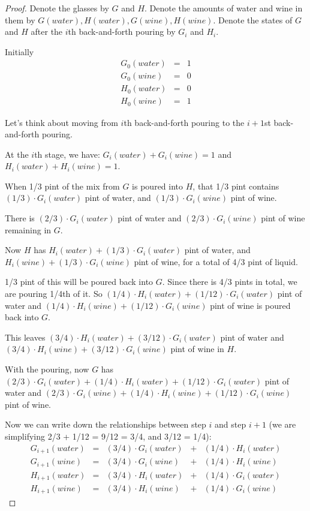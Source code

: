 \documentclass[14pt]{extarticle}
\begin{document}
\begin{proof}
Denote the glasses by $G$ and $H$. Denote the amounts of water and wine in them by $G(water), H(water), G(wine), H(wine)$. Denote the states of $G$ and $H$ after the $i$th back-and-forth pouring by $G_i$ and $H_i$.

Initially
$$
\begin{array}{lcl}
G_0(water)&=&1\\
G_0(wine)&=&0\\
H_0(water)&=&0\\
H_0(wine)&=&1
\end{array}
$$

Let's think about moving from $i$th back-and-forth pouring to the $i+1$st back-and-forth pouring.

At the $i$th stage, we have: $G_i(water) + G_i(wine) = 1$ and $H_i(water) + H_i(wine) = 1$.

When 1/3 pint of the mix from $G$ is poured into $H$, that 1/3 pint contains $(1/3) \cdot G_i(water)$ pint of water, and $(1/3) \cdot G_i(wine)$ pint of wine.

There is $(2/3) \cdot G_i(water)$ pint of water and $(2/3) \cdot G_i(wine)$ pint of wine remaining in $G$.

Now $H$ has $H_i(water) + (1/3)\cdot G_i(water)$ pint of water, and $H_i(wine) + (1/3)\cdot G_i(wine)$ pint of wine, for a total of 4/3 pint of liquid.

1/3 pint of this will be poured back into $G$. Since there is 4/3 pints in total, we are pouring 1/4th of it. So $(1/4) \cdot H_i(water) + (1/12)\cdot G_i(water)$ pint of water and $(1/4) \cdot H_i(wine) + (1/12)\cdot G_i(wine)$ pint of wine is poured back into $G$.

This leaves $(3/4) \cdot H_i(water) + (3/12)\cdot G_i(water)$ pint of water and $(3/4) \cdot H_i(wine) + (3/12)\cdot G_i(wine)$ pint of wine in $H$.

With the pouring, now $G$ has $(2/3) \cdot G_i(water) + (1/4) \cdot H_i(water) + (1/12)\cdot G_i(water)$ pint of water and $(2/3) \cdot G_i(wine) + (1/4) \cdot H_i(wine) + (1/12)\cdot G_i(wine)$ pint of wine.

Now we can write down the relationships between step $i$ and step $i+1$ (we are simplifying 2/3 + 1/12 = 9/12 = 3/4, and 3/12 = 1/4):
$$
\begin{array}{lclll}
G_{i+1}(water)&=&(3/4) \cdot G_i(water) &+& (1/4) \cdot H_i(water)\\
G_{i+1}(wine)&=&(3/4) \cdot G_i(wine) &+& (1/4) \cdot H_i(wine)\\
H_{i+1}(water)&=&(3/4) \cdot H_i(water) &+& (1/4)\cdot G_i(water)\\
H_{i+1}(wine)&=&(3/4) \cdot H_i(wine) &+& (1/4)\cdot G_i(wine)
\end{array}
$$


\end{proof}
\end{document}
